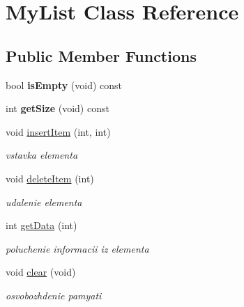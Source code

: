 \hypertarget{class_my_list}{}\section{My\+List Class Reference}
\label{class_my_list}
\subsection*{Public Member Functions}
\begin{DoxyCompactItemize}
\item 
\hypertarget{class_my_list_a872cebf19c0b31e99267b875d1b11c22}{}bool {\bfseries is\+Empty} (void) const \label{class_my_list_a872cebf19c0b31e99267b875d1b11c22}

\item 
\hypertarget{class_my_list_af4214a59697585dacb5cdf5a0407bffb}{}int {\bfseries get\+Size} (void) const \label{class_my_list_af4214a59697585dacb5cdf5a0407bffb}

\item 
\hypertarget{class_my_list_a5de8c1e2a6cbb2e0beb9302b2c38f47b}{}void \hyperlink{class_my_list_a5de8c1e2a6cbb2e0beb9302b2c38f47b}{insert\+Item} (int, int)\label{class_my_list_a5de8c1e2a6cbb2e0beb9302b2c38f47b}

\begin{DoxyCompactList}\small\item\em vstavka elementa \end{DoxyCompactList}\item 
\hypertarget{class_my_list_a69d05f4416c0ef697c29a29e3c56d499}{}void \hyperlink{class_my_list_a69d05f4416c0ef697c29a29e3c56d499}{delete\+Item} (int)\label{class_my_list_a69d05f4416c0ef697c29a29e3c56d499}

\begin{DoxyCompactList}\small\item\em udalenie elementa \end{DoxyCompactList}\item 
\hypertarget{class_my_list_a7891670e2b0892cbfdd7f355cae8e4cb}{}int \hyperlink{class_my_list_a7891670e2b0892cbfdd7f355cae8e4cb}{get\+Data} (int)\label{class_my_list_a7891670e2b0892cbfdd7f355cae8e4cb}

\begin{DoxyCompactList}\small\item\em poluchenie informacii iz elementa \end{DoxyCompactList}\item 
\hypertarget{class_my_list_a0609c01b2b405a03b402d18ae060654e}{}void \hyperlink{class_my_list_a0609c01b2b405a03b402d18ae060654e}{clear} (void)\label{class_my_list_a0609c01b2b405a03b402d18ae060654e}

\begin{DoxyCompactList}\small\item\em osvobozhdenie pamyati \end{DoxyCompactList}\end{DoxyCompactItemize}



